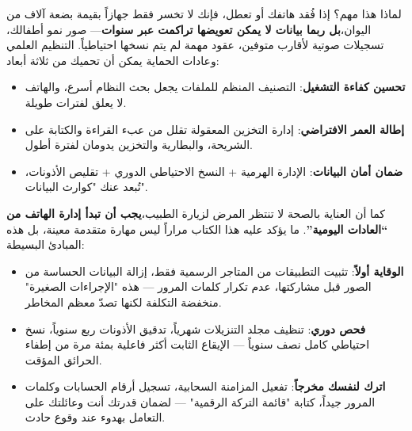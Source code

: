 \begin{tcbinfo}{لماذا هذا مهم؟}
إذا فُقد هاتفك أو تعطل، فإنك لا تخسر فقط جهازاً بقيمة بضعة آلاف من اليوان،\textbf{بل ربما بيانات لا يمكن تعويضها تراكمت عبر سنوات}— صور نمو أطفالك، تسجيلات صوتية لأقارب متوفين، عقود مهمة لم يتم نسخها احتياطياً. التنظيم العلمي وعادات الحماية يمكن أن تحميك من ثلاثة أبعاد:

\begin{itemize}
  \item \textbf{تحسين كفاءة التشغيل}: التصنيف المنظم للملفات يجعل بحث النظام أسرع، والهاتف لا يعلق لفترات طويلة.
  \item \textbf{إطالة العمر الافتراضي}: إدارة التخزين المعقولة تقلل من عبء القراءة والكتابة على الشريحة، والبطارية والتخزين يدومان لفترة أطول.
  \item \textbf{ضمان أمان البيانات}: الإدارة الهرمية + النسخ الاحتياطي الدوري + تقليص الأذونات، تُبعد عنك "كوارث البيانات".
\end{itemize}

\end{tcbinfo}


كما أن العناية بالصحة لا تنتظر المرض لزيارة الطبيب،\textbf{يجب أن تبدأ إدارة الهاتف من “العادات اليومية”}. ما يؤكد عليه هذا الكتاب مراراً ليس مهارة متقدمة معينة، بل هذه المبادئ البسيطة:

\begin{itemize}
  \item \textbf{الوقاية أولاً}: تثبيت التطبيقات من المتاجر الرسمية فقط، إزالة البيانات الحساسة من الصور قبل مشاركتها، عدم تكرار كلمات المرور — هذه "الإجراءات الصغيرة" منخفضة التكلفة لكنها تصدّ معظم المخاطر.
  \item \textbf{فحص دوري}: تنظيف مجلد التنزيلات شهرياً، تدقيق الأذونات ربع سنوياً، نسخ احتياطي كامل نصف سنوياً — الإيقاع الثابت أكثر فاعلية بمئة مرة من إطفاء الحرائق المؤقت.
  \item \textbf{اترك لنفسك مخرجاً}: تفعيل المزامنة السحابية، تسجيل أرقام الحسابات وكلمات المرور جيداً، كتابة "قائمة التركة الرقمية" — لضمان قدرتك أنت وعائلتك على التعامل بهدوء عند وقوع حادث.
\end{itemize}
